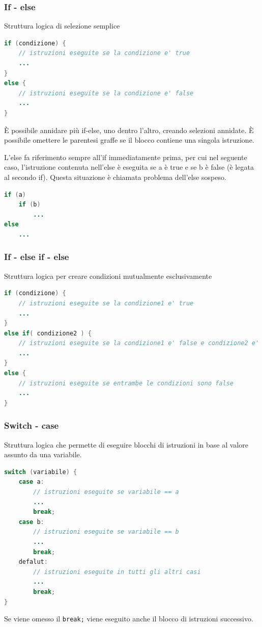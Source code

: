\documentclass[a4paper]{article}
\begin{document}
\subsubsection*{If - else}
Struttura logica di selezione semplice
\begin{lstlisting}[language=Java]
if (condizione) {
	// istruzioni eseguite se la condizione e' true
	...
}
else {
	// istruzioni eseguite se la condizione e' false
	...
}
\end{lstlisting}
È possibile annidare più if-else, uno dentro l'altro, creando selezioni annidate. È possibile omettere le parentesi graffe se il
blocco contiene una singola istruzione.

L'else fa riferimento sempre all'if immediatamente prima, per cui nel seguente caso, l'istruzione contenuta nell'else è eseguita
se a è true e se b è false (è legata al secondo if). Questa situazione è chiamata problema dell'else sospeso.
\begin{lstlisting}[language=Java]
if (a)
	if (b)
		...
else
	...
\end{lstlisting}

\subsubsection*{If - else if - else}
Struttura logica per creare condizioni mutualmente esclusivamente
\begin{lstlisting}[language=Java]
if (condizione) {
	// istruzioni eseguite se la condizione1 e' true
	...
}
else if( condizione2 ) {
	// istruzioni eseguite se la condizione1 e' false e condizione2 e' true
	...
}
else {
	// istruzioni eseguite se entrambe le condizioni sono false
	...
}
\end{lstlisting}


\subsubsection*{Switch - case}
Struttura logica che permette di eseguire blocchi di istruzioni in base al valore assunto da una variabile.
\begin{lstlisting}[language=Java]
switch (variabile) {
	case a:
		// istruzioni eseguite se variabile == a
		...
		break;
	case b:
		// istruzioni eseguite se variabile == b
		...
		break;
	defalut:
		// istruzioni eseguite in tutti gli altri casi
		...
		break;
}
\end{lstlisting}
Se viene omesso il \verb|break;| viene eseguito anche il blocco di istruzioni successivo.
\end{document}
